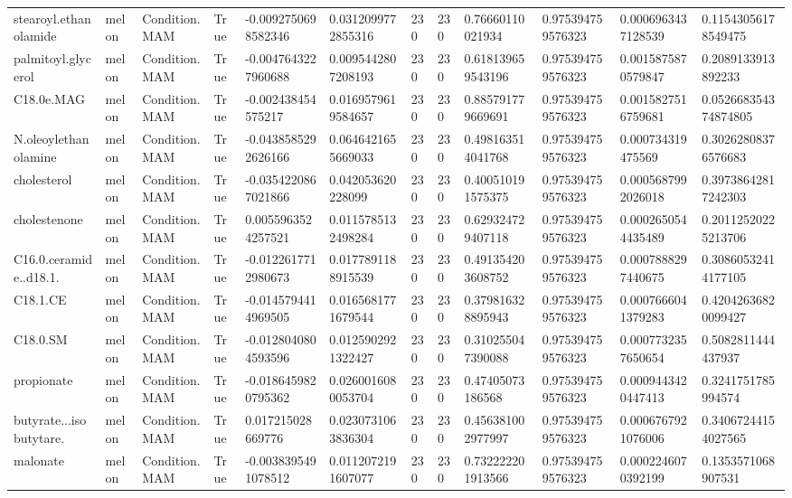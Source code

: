 \begin{longtable}{llllllllllll}
stearoyl.ethanolamide & melon & Condition.MAM & True & -0.0092750698582346 & 0.0312099772855316 & 230 & 230 & 0.76660110021934 & 0.975394759576323 & 0.0006963437128539 & 0.11543056178549475 \\
palmitoyl.glycerol & melon & Condition.MAM & True & -0.0047643227960688 & 0.0095442807208193 & 230 & 230 & 0.618139659543196 & 0.975394759576323 & 0.0015875870579847 & 0.2089133913892233 \\
C18.0e.MAG & melon & Condition.MAM & True & -0.002438454575217 & 0.0169579619584657 & 230 & 230 & 0.885791779669691 & 0.975394759576323 & 0.0015827516759681 & 0.052668354374874805 \\
N.oleoylethanolamine & melon & Condition.MAM & True & -0.0438585292626166 & 0.0646421655669033 & 230 & 230 & 0.498163514041768 & 0.975394759576323 & 0.000734319475569 & 0.30262808376576683 \\
cholesterol & melon & Condition.MAM & True & -0.0354220867021866 & 0.042053620228099 & 230 & 230 & 0.400510191575375 & 0.975394759576323 & 0.0005687992026018 & 0.39738642817242303 \\
cholestenone & melon & Condition.MAM & True & 0.0055963524257521 & 0.0115785132498284 & 230 & 230 & 0.629324729407118 & 0.975394759576323 & 0.0002650544435489 & 0.20112520225213706 \\
C16.0.ceramide..d18.1. & melon & Condition.MAM & True & -0.0122617712980673 & 0.0177891188915539 & 230 & 230 & 0.491354203608752 & 0.975394759576323 & 0.0007888297440675 & 0.30860532414177105 \\
C18.1.CE & melon & Condition.MAM & True & -0.0145794414969505 & 0.0165681771679544 & 230 & 230 & 0.379816328895943 & 0.975394759576323 & 0.0007666041379283 & 0.42042636820099427 \\
C18.0.SM & melon & Condition.MAM & True & -0.0128040804593596 & 0.0125902921322427 & 230 & 230 & 0.310255047390088 & 0.975394759576323 & 0.0007732357650654 & 0.5082811444437937 \\
propionate & melon & Condition.MAM & True & -0.0186459820795362 & 0.0260016080053704 & 230 & 230 & 0.47405073186568 & 0.975394759576323 & 0.0009443420447413 & 0.3241751785994574 \\
butyrate...isobutytare. & melon & Condition.MAM & True & 0.017215028669776 & 0.0230731063836304 & 230 & 230 & 0.456381002977997 & 0.975394759576323 & 0.0006767921076006 & 0.34067244154027565 \\
malonate & melon & Condition.MAM & True & -0.0038395491078512 & 0.0112072191607077 & 230 & 230 & 0.732222201913566 & 0.975394759576323 & 0.0002246070392199 & 0.1353571068907531 \\

\end{longtable}
